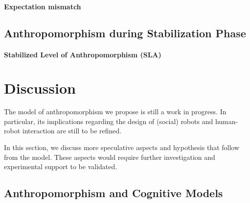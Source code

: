 \documentclass[lettersize, apacite, twoside, HRI]{apa_HRI}
\begin{document}
\paragraph{Expectation mismatch}

\subsection{Anthropomorphism during Stabilization Phase}
\label{sec:stabilization}

\paragraph{Stabilized Level of Anthropomorphism (SLA)}


%
%
%
%
%
%

\section{Discussion}
\label{sec:discussion}

The model of anthropomorphism we propose is still a work in progress. In
particular, its implications regarding the design of (social) robots and
human-robot interaction are still to be refined.

In this section, we discuss more speculative aspects and hypothesis that follow
from the model. These aspects would require further investigation and
experimental support to be validated.

\subsection{Anthropomorphism and Cognitive Models}
\label{sec:cognitivemodel}
\end{document}
